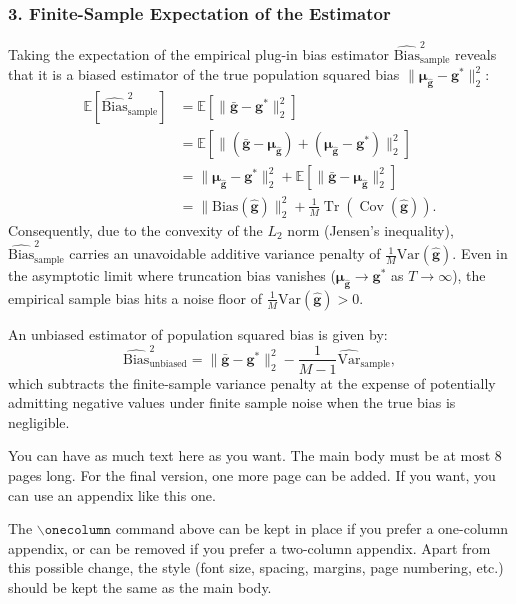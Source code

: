 \documentclass{article}
\theoremstyle{plain}
\theoremstyle{definition}
\theoremstyle{remark}
\begin{document}
\subsubsection*{3. Finite-Sample Expectation of the Estimator}
Taking the expectation of the empirical plug-in bias estimator $\widehat{\mathrm{Bias}}^2_{\mathrm{sample}}$ reveals that it is a biased estimator of the true population squared bias $\|\bm{\mu}_{\hat{\bm{g}}} - \bm{g}^*\|_2^2$:
\begin{align}
  \mathbb{E}\left[ \widehat{\mathrm{Bias}}^2_{\mathrm{sample}} \right] 
  &= \mathbb{E}\left[ \|\bar{\bm{g}} - \bm{g}^*\|_2^2 \right] \nonumber \\
  &= \mathbb{E}\left[ \|\left(\bar{\bm{g}} - \bm{\mu}_{\hat{\bm{g}}}\right) + \left(\bm{\mu}_{\hat{\bm{g}}} - \bm{g}^*\right)\|_2^2 \right] \nonumber \\
  &= \|\bm{\mu}_{\hat{\bm{g}}} - \bm{g}^*\|_2^2 + \mathbb{E}\left[ \|\bar{\bm{g}} - \bm{\mu}_{\hat{\bm{g}}}\|_2^2 \right] \nonumber \\
  &= \|\text{Bias}(\hat{\bm{g}})\|_2^2 + \frac{1}{M} \operatorname{Tr}\left(\operatorname{Cov}(\hat{\bm{g}})\right). \label{eq:bias_floor}
\end{align}
Consequently, due to the convexity of the $L_2$ norm (Jensen's inequality), $\widehat{\mathrm{Bias}}^2_{\mathrm{sample}}$ carries an unavoidable additive variance penalty of $\frac{1}{M}\mathrm{Var}(\hat{\bm{g}})$. Even in the asymptotic limit where truncation bias vanishes ($\bm{\mu}_{\hat{\bm{g}}} \to \bm{g}^*$ as $T \to \infty$), the empirical sample bias hits a noise floor of $\frac{1}{M}\mathrm{Var}(\hat{\bm{g}}) > 0$.

An unbiased estimator of population squared bias is given by:
\begin{equation}
  \widehat{\mathrm{Bias}}^2_{\mathrm{unbiased}} = \|\bar{\bm{g}} - \bm{g}^*\|_2^2 - \frac{1}{M-1}\widehat{\mathrm{Var}}_{\mathrm{sample}},
\end{equation}
which subtracts the finite-sample variance penalty at the expense of potentially admitting negative values under finite sample noise when the true bias is negligible.


You can have as much text here as you want. The main body must be at most $8$
pages long. For the final version, one more page can be added. If you want, you
can use an appendix like this one.

The $\mathtt{\backslash onecolumn}$ command above can be kept in place if you
prefer a one-column appendix, or can be removed if you prefer a two-column
appendix.  Apart from this possible change, the style (font size, spacing,
margins, page numbering, etc.) should be kept the same as the main body.
\end{document}
